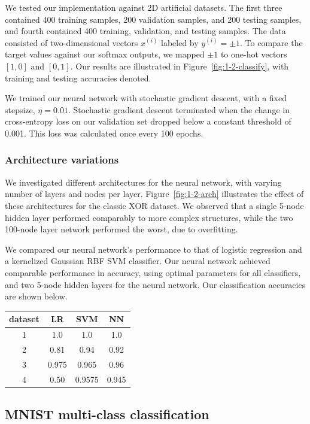 \documentclass{article}
\newcommand{\sind}[1]{^{(#1)}}
\begin{document}
\begin{multicols}{2}
We tested our implementation against 2D artificial datasets.
The first three contained 400 training samples,
200 validation samples,
and 200 testing samples, and fourth contained 
400 training, validation, and testing samples.
The data consisted of two-dimensional vectors $x\sind{i}$
labeled by $y\sind{i} = \pm1$.
To compare the target values against our softmax outputs,
we mapped $\pm1$ to one-hot vectors $[1,0]$ and $[0,1]$.
Our results are illustrated in Figure~\ref{fig:1-2-classify},
with training and testing accuracies denoted.

We trained our neural network with stochastic gradient descent, with a 
fixed stepsize, $\eta = 0.01$. Stochastic gradient descent terminated when
the change in cross-entropy loss on our validation set dropped below a constant threshold of 0.001.
This loss was calculated once every 100 epochs.

\subsubsection{Architecture variations}
\label{subsubsubsec:binaryarch}
We investigated different architectures for the neural network,
with varying number of layers and nodes per layer.
Figure~\ref{fig:1-2-arch} illustrates the effect of these architectures for the classic XOR dataset.
We observed that a single 5-node hidden layer performed comparably to more complex structures,
while the two 100-node layer network performed the worst, due to overfitting.

We compared our neural network's performance to that of 
logistic regression and a kernelized Gaussian RBF SVM classifier.
Our neural network achieved comparable performance in accuracy,
using optimal parameters for all classifiers,
and two 5-node hidden layers for the neural network.
Our classification accuracies are shown below.

\begin{center}
\begin{tabular}{c|c|c|c}
dataset 	& LR  	& SVM & NN  \\\hline
        1	&1.0		& 1.0 & 1.0\\
        2	&0.81	& 0.94 & 0.92 \\
        3	&0.975 	& 0.965 & 0.96 \\
        4	&0.50	& 0.9575 & 0.945
\end{tabular}
\end{center}

\subsection{MNIST multi-class classification}


\end{multicols}
\end{document}
